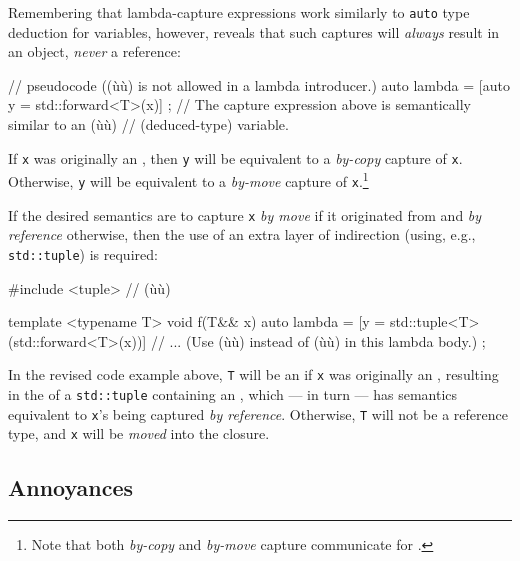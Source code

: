 Remembering that lambda-capture expressions work similarly to
\lstinline!auto! type deduction for variables, however,
reveals that such captures will \emph{always} result in an object, \emph{never} a reference:

\begin{emcppslisting}[emcppsignore={pseudocode}]
// pseudocode ((ù{}ù) is not allowed in a lambda introducer.)
auto lambda = [auto y = std::forward<T>(x)] { };
    // The capture expression above is semantically similar to an (ù{}ù)
    // (deduced-type) variable.
\end{emcppslisting}
    
\noindent If \lstinline!x! was originally an , then \lstinline!y! will be
equivalent to a \emph{by-copy} capture of \lstinline!x!. Otherwise,
\lstinline!y! will be equivalent to a \emph{by-move} capture of
\lstinline!x!.{\cprotect\footnote{Note that both \emph{by-copy} and
\emph{by-move} capture communicate  for
  .}}

If the desired semantics are to capture \lstinline!x! \emph{by move} if it
originated from  and \emph{by reference} otherwise, then
the use of an extra layer of indirection (using, e.g.,
\lstinline!std::tuple!) is required:

\begin{emcppslisting}[emcppsstandards={c++14}]
#include <tuple>  // (ù{}ù)

template <typename T>
void f(T&& x)
{
    auto lambda = [y = std::tuple<T>(std::forward<T>(x))]
    {
        // ... (Use (ù{}ù) instead of (ù{}ù) in this lambda body.)
    };
}
\end{emcppslisting}
    
\noindent In the revised code example above, \lstinline!T! will be an  if \lstinline!x! was originally an , resulting in
the  of a \lstinline!std::tuple! containing an
, which --- in turn --- has semantics
equivalent to \lstinline!x!'s being captured \emph{by reference}.
Otherwise, \lstinline!T! will not be a reference type, and \lstinline!x! will
be \emph{moved} into the closure.

\subsection[Annoyances]{Annoyances}\label{annoyances-lambdacapture}

